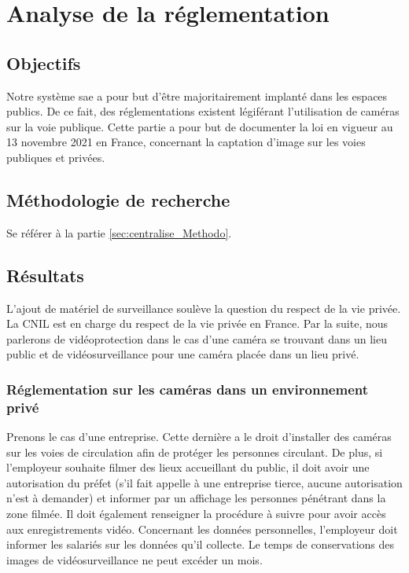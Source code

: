 \section{Analyse de la réglementation}
\label{sec:reglementation}

\subsection{Objectifs}
\label{sec:reglementation_Objectifs}

Notre système \gls{sae} a pour but d'être majoritairement implanté dans les espaces publics. 
De ce fait, des réglementations existent légiférant l'utilisation de caméras sur la voie publique.
Cette partie a pour but de documenter la loi en vigueur au 13 novembre 2021 en France, concernant la captation d'image sur les voies publiques et privées. 

\subsection{Méthodologie de recherche}
\label{sec:reglementation_Methodo}

Se référer à la partie \ref{sec:centralise_Methodo}.

\subsection{Résultats}
\label{sec:reglementation_resultats}

L'ajout de matériel de surveillance soulève la question du respect de la vie privée. La \gls{CNIL} est en charge du respect de la vie privée en France.
Par la suite, nous parlerons de vidéoprotection dans le cas d'une caméra se trouvant dans un lieu public 
et de vidéosurveillance pour une caméra placée dans un lieu privé.

\subsubsection{Réglementation sur les caméras dans un environnement privé}
\label{sec:reglementation_privee}

Prenons le cas d'une entreprise. Cette dernière a le droit d'installer des caméras sur les voies de circulation afin de protéger les personnes circulant.
De plus, si l'employeur souhaite filmer des lieux accueillant du public, il doit avoir une autorisation du préfet (s'il fait appelle à une entreprise tierce, aucune autorisation n'est à demander) 
et informer par un affichage les personnes pénétrant dans la zone filmée. Il doit également renseigner la procédure à suivre pour avoir accès aux enregistrements vidéo.
Concernant les données personnelles, l'employeur doit informer les salariés sur les données qu'il collecte. Le temps de conservations des images de vidéosurveillance ne peut excéder un mois.


